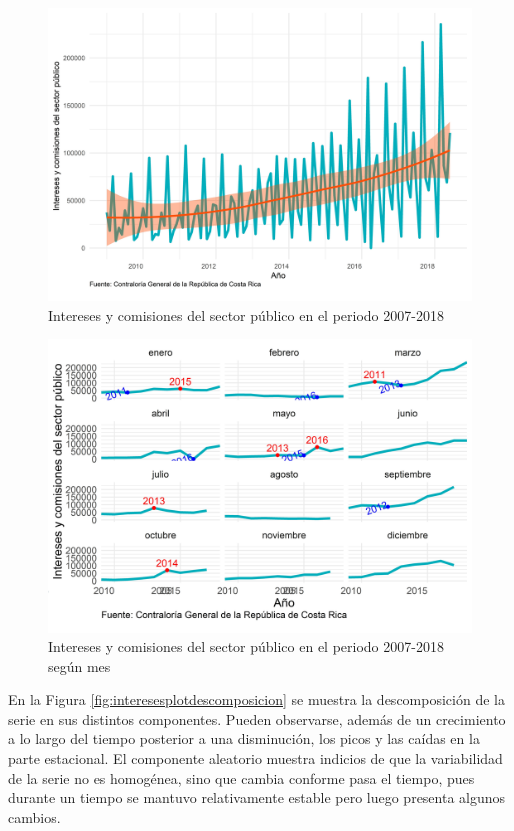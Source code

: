 \documentclass[
]{article}
\begin{document}
\begin{figure}[H]
\includegraphics[width=1\linewidth,height=1\textheight]{Tesis_files/figure-latex/interesesplotgeneral-1} \caption{Intereses y comisiones del sector público en el periodo 2007-2018}\label{fig:interesesplotgeneral}
\end{figure}

\begin{figure}[H]
\includegraphics[width=1\linewidth,height=1\textheight]{Tesis_files/figure-latex/interesesplotperiodos-1} \caption{Intereses y comisiones del sector público en el periodo 2007-2018 según mes}\label{fig:interesesplotperiodos}
\end{figure}

En la Figura \ref{fig:interesesplotdescomposicion} se muestra la
descomposición de la serie en sus distintos componentes. Pueden
observarse, además de un crecimiento a lo largo del tiempo posterior a
una disminución, los picos y las caídas en la parte estacional. El
componente aleatorio muestra indicios de que la variabilidad de la serie
no es homogénea, sino que cambia conforme pasa el tiempo, pues durante
un tiempo se mantuvo relativamente estable pero luego presenta algunos
cambios.
\end{document}
